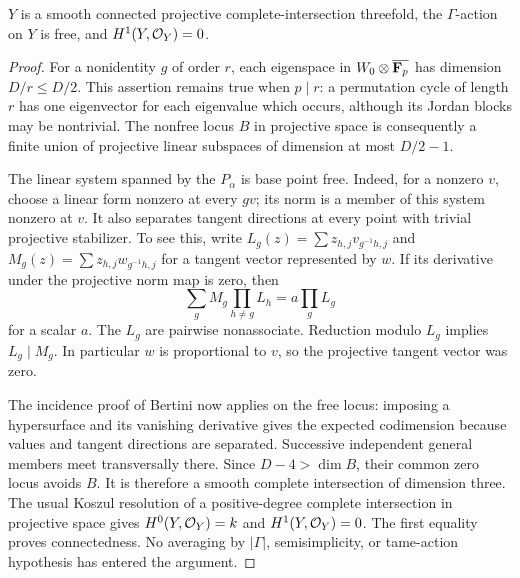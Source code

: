 \begin{lemma}\label{lem:DE-free-ci}
$Y$ is a smooth connected projective complete-intersection threefold, the $\Gamma$-action on $Y$ is free, and $H^1(Y,\mathcal O_Y)=0$.
\end{lemma}
\begin{proof}
For a nonidentity $g$ of order $r$, each eigenspace in $W_0\otimes\overline{\mathbf F_p}$ has dimension $D/r\leq D/2$.  This assertion remains true when $p\mid r$: a permutation cycle of length $r$ has one eigenvector for each eigenvalue which occurs, although its Jordan blocks may be nontrivial.  The nonfree locus $B$ in projective space is consequently a finite union of projective linear subspaces of dimension at most $D/2-1$.

The linear system spanned by the $P_\alpha$ is base point free.  Indeed, for a nonzero $v$, choose a linear form nonzero at every $gv$; its norm is a member of this system nonzero at $v$.  It also separates tangent directions at every point with trivial projective stabilizer.  To see this, write $L_g(z)=\sum z_{h,j}v_{g^{-1}h,j}$ and $M_g(z)=\sum z_{h,j}w_{g^{-1}h,j}$ for a tangent vector represented by $w$.  If its derivative under the projective norm map is zero, then
\[
 \sum_g M_g\prod_{h\ne g}L_h=a\prod_gL_g
\]
for a scalar $a$.  The $L_g$ are pairwise nonassociate.  Reduction modulo $L_g$ implies $L_g\mid M_g$.  In particular $w$ is proportional to $v$, so the projective tangent vector was zero.

The incidence proof of Bertini now applies on the free locus: imposing a hypersurface and its vanishing derivative gives the expected codimension because values and tangent directions are separated.  Successive independent general members meet transversally there.  Since $D-4>\dim B$, their common zero locus avoids $B$.  It is therefore a smooth complete intersection of dimension three.  The usual Koszul resolution of a positive-degree complete intersection in projective space gives $H^0(Y,\mathcal O_Y)=k$ and $H^1(Y,\mathcal O_Y)=0$.  The first equality proves connectedness.  No averaging by $|\Gamma|$, semisimplicity, or tame-action hypothesis has entered the argument.
\end{proof}

